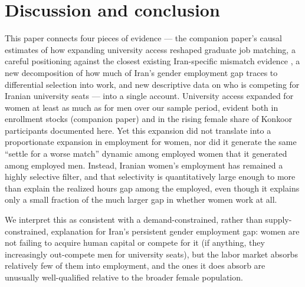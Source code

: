 \documentclass[11pt]{article}
\begin{document}
\section{Discussion and conclusion}

This paper connects four pieces of evidence --- the companion paper's causal estimates of how expanding university access reshaped graduate job matching, a careful positioning against the closest existing Iran-specific mismatch evidence \citep{haddad2017}, a new decomposition of how much of Iran's gender employment gap traces to differential selection into work, and new descriptive data on who is competing for Iranian university seats --- into a single account. University access expanded for women at least as much as for men over our sample period, evident both in enrollment stocks (companion paper) and in the rising female share of Konkoor participants documented here. Yet this expansion did not translate into a proportionate expansion in employment for women, nor did it generate the same ``settle for a worse match'' dynamic among employed women that it generated among employed men. Instead, Iranian women's employment has remained a highly selective filter, and that selectivity is quantitatively large enough to more than explain the realized hours gap among the employed, even though it explains only a small fraction of the much larger gap in whether women work at all.

We interpret this as consistent with a demand-constrained, rather than supply-constrained, explanation for Iran's persistent gender employment gap: women are not failing to acquire human capital or compete for it (if anything, they increasingly out-compete men for university seats), but the labor market absorbs relatively few of them into employment, and the ones it does absorb are unusually well-qualified relative to the broader female population.
\end{document}
